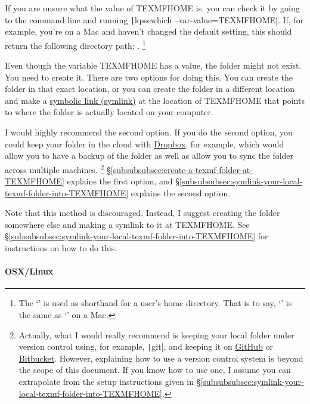 If you are unsure what the value of TEXMFHOME is, you can check it by going to the command line and running \texttt|kpsewhich --var-value=TEXMFHOME|.
If, for example, you're on a Mac and haven't changed the default setting, this should return the following directory path: .%
\footnote{%
The `\Directory{\textasciitilde}' is used as shorthand for a user's home directory.
That is to say, `' is the same as `' on a Mac.%
}

Even though the variable TEXMFHOME has a value, the folder might not exist.
You need to create it.
There are two options for doing this.
You can create the folder in that exact location, or you can create the folder in a different location and make a \href{https://en.wikipedia.org/wiki/Symbolic_link}{symbolic link (symlink)} at the location of TEXMFHOME that points to where the folder is actually located on your computer.

I would highly recommend the second option.
If you do the second option, you could keep your  folder in the cloud with \href{https://dropbox.com/}{Dropbox}, for example, which would allow you to have a backup of the folder as well as allow you to sync the folder across multiple machines.%
\footnote{%
Actually, what I would really recommend is keeping your local  folder under version control using, for example, \texttt|git|, and keeping it on \href{https://github.com/}{GitHub} or \href{https://bitbucket.org/}{Bitbucket}.
However, explaining how to use a version control system is beyond the scope of this document.
If you know how to use one, I assume you can extrapolate from the setup instructions given in \S\ref{subsubsubsec:symlink-your-local-texmf-folder-into-TEXMFHOME}.%
}
\S\ref{subsubsubsec:create-a-texmf-folder-at-TEXMFHOME} explains the first option, and \S\ref{subsubsubsec:symlink-your-local-texmf-folder-into-TEXMFHOME} explains the second option.

\label{subsubsubsec:create-a-texmf-folder-at-TEXMFHOME}

Note that this method is discouraged.
Instead, I suggest creating the folder somewhere else and making a symlink to it at TEXMFHOME.
See \S\ref{subsubsubsec:symlink-your-local-texmf-folder-into-TEXMFHOME} for instructions on how to do this.

\paragraph{OSX/Linux}

